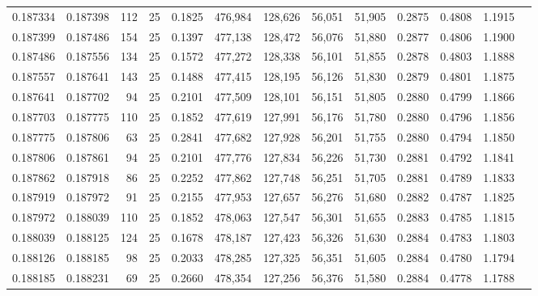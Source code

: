 \begin{tabular}{rrrrrrrrrrrrr}
0.187334 & 0.187398 &   112 &  25 &                                     0.1825 & 476,984 & 128,626 &  56,051 &  51,905 & 0.2875 & 0.4808 & 1.1915 \\
0.187399 & 0.187486 &   154 &  25 &                                     0.1397 & 477,138 & 128,472 &  56,076 &  51,880 & 0.2877 & 0.4806 & 1.1900 \\
0.187486 & 0.187556 &   134 &  25 &                                     0.1572 & 477,272 & 128,338 &  56,101 &  51,855 & 0.2878 & 0.4803 & 1.1888 \\
0.187557 & 0.187641 &   143 &  25 &                                     0.1488 & 477,415 & 128,195 &  56,126 &  51,830 & 0.2879 & 0.4801 & 1.1875 \\
0.187641 & 0.187702 &    94 &  25 &                                     0.2101 & 477,509 & 128,101 &  56,151 &  51,805 & 0.2880 & 0.4799 & 1.1866 \\
0.187703 & 0.187775 &   110 &  25 &                                     0.1852 & 477,619 & 127,991 &  56,176 &  51,780 & 0.2880 & 0.4796 & 1.1856 \\
0.187775 & 0.187806 &    63 &  25 &                                     0.2841 & 477,682 & 127,928 &  56,201 &  51,755 & 0.2880 & 0.4794 & 1.1850 \\
0.187806 & 0.187861 &    94 &  25 &                                     0.2101 & 477,776 & 127,834 &  56,226 &  51,730 & 0.2881 & 0.4792 & 1.1841 \\
0.187862 & 0.187918 &    86 &  25 &                                     0.2252 & 477,862 & 127,748 &  56,251 &  51,705 & 0.2881 & 0.4789 & 1.1833 \\
0.187919 & 0.187972 &    91 &  25 &                                     0.2155 & 477,953 & 127,657 &  56,276 &  51,680 & 0.2882 & 0.4787 & 1.1825 \\
0.187972 & 0.188039 &   110 &  25 &                                     0.1852 & 478,063 & 127,547 &  56,301 &  51,655 & 0.2883 & 0.4785 & 1.1815 \\
0.188039 & 0.188125 &   124 &  25 &                                     0.1678 & 478,187 & 127,423 &  56,326 &  51,630 & 0.2884 & 0.4783 & 1.1803 \\
0.188126 & 0.188185 &    98 &  25 &                                     0.2033 & 478,285 & 127,325 &  56,351 &  51,605 & 0.2884 & 0.4780 & 1.1794 \\
0.188185 & 0.188231 &    69 &  25 &                                     0.2660 & 478,354 & 127,256 &  56,376 &  51,580 & 0.2884 & 0.4778 & 1.1788 \\

\end{tabular}
